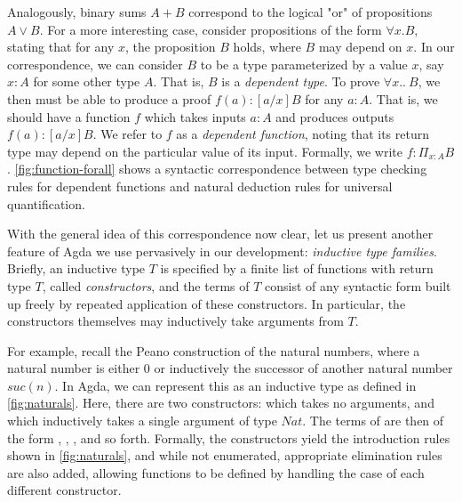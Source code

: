 

Analogously, binary sums $A + B$ correspond to the logical "or" of propositions $A \lor B$. For a more interesting case, consider propositions of the form $\forall x. B$, stating that for any $x$, the proposition $B$ holds, where $B$ may depend on $x$. In our correspondence, we can consider $B$ to be a type parameterized by a value $x$, say $x : A$ for some other type $A$. That is, $B$ is a \emph{dependent type}. To prove $\forall x..~ B$, we then must be able to produce a proof $f(a) : [a / x]B$ for any $a : A$. That is, we should have a function $f$ which takes inputs $a : A$ and produces outputs $f(a) : [a / x]B$. We refer to $f$ as a \emph{dependent function}, noting that its return type may depend on the particular value of its input. Formally, we write $f : \Pi_{x : A} B$. \autoref{fig:function-forall} shows a syntactic correspondence between type checking rules for dependent functions and natural deduction rules for universal quantification. 



With the general idea of this correspondence now clear, let us present another feature of Agda we use pervasively in our development: \emph{inductive type families}. Briefly, an inductive type $T$ is specified by a finite list of functions with return type $T$, called \emph{constructors}, and the terms of $T$ consist of any syntactic form built up freely by repeated application of these constructors. In particular, the constructors themselves may inductively take arguments from $T$.

For example, recall the Peano construction of the natural numbers, where a natural number is either $0$ or inductively the successor of another natural number $suc(n)$. In Agda, we can represent this as an inductive type  as defined in \autoref{fig:naturals}. Here, there are two constructors:  which takes no arguments, and  which inductively takes a single argument of type $Nat$. The terms of  are then of the form ,\; ,\; , and so forth. Formally, the constructors yield the introduction rules shown in \autoref{fig:naturals}, and while not enumerated, appropriate elimination rules are also added, allowing functions to be defined by handling the case of each different constructor.



